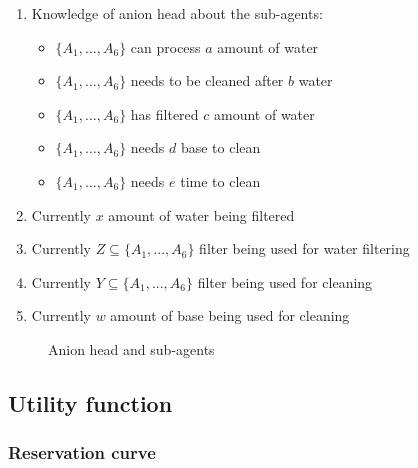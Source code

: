 \begin{enumerate}
	\item
	Knowledge of anion head about the sub-agents:
	\begin{itemize}
		\item {$\{A_1, ..., A_6\}$ can process $a$ amount of water}
		\item {$\{A_1, ..., A_6\}$ needs to be cleaned after $b$ water}
		\item {$\{A_1, ..., A_6\}$ has filtered $c$ amount of water}
		\item {$\{A_1, ..., A_6\}$ needs $d$ base to clean}
		\item {$\{A_1, ..., A_6\}$ needs $e$ time to clean}
	\end{itemize}
	\item
	Currently $x$ amount of water being filtered 
	\item
	Currently $Z \subseteq \{A_1, ..., A_6\}$ filter being used for water filtering
	\item
	Currently $Y \subseteq \{A_1, ..., A_6\}$ filter being used for cleaning
	\item
	Currently $w$ amount of base being used for cleaning
\end{enumerate}

\begin{figure}[h]
	
	\centering
	\caption{Anion head and sub-agents}
	\label{fig:anion-head-sub}
	
\end{figure}


\subsection{Utility function}
\subsubsection{Reservation curve}

